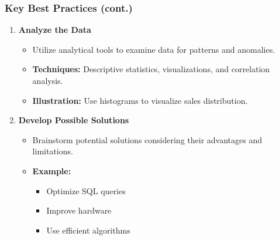 \documentclass[aspectratio=169]{beamer}
\begin{document}
\begin{frame}[fragile]
    \frametitle{Key Best Practices (cont.)}
    \begin{enumerate}[resume]
        \item \textbf{Analyze the Data}
            \begin{itemize}
                \item Utilize analytical tools to examine data for patterns and anomalies.
                \item \textbf{Techniques:} Descriptive statistics, visualizations, and correlation analysis.
                \item \textbf{Illustration:} Use histograms to visualize sales distribution.
            \end{itemize}

        \item \textbf{Develop Possible Solutions}
            \begin{itemize}
                \item Brainstorm potential solutions considering their advantages and limitations.
                \item \textbf{Example:} 
                    \begin{itemize}
                        \item Optimize SQL queries
                        \item Improve hardware
                        \item Use efficient algorithms
                    \end{itemize}
            \end{itemize}
    \end{enumerate}
\end{frame}
\end{document}
